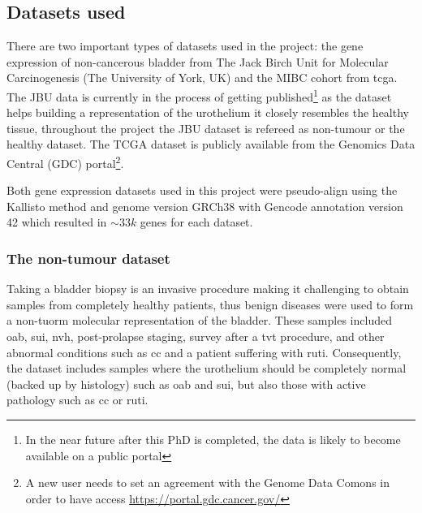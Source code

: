 \subsection{Datasets used} \label{s:lit:datasets_used}

There are two important types of datasets used in the project: the gene expression of non-cancerous bladder from The Jack Birch Unit for Molecular Carcinogenesis (The University of York, UK) and the MIBC cohort from \acrlong{tcga}. The JBU data is currently in the process of getting published\footnote{In the near future after this PhD is completed, the data is likely to become available on a public portal} as the dataset helps building a representation of the urothelium it closely resembles the healthy tissue, throughout the project the JBU dataset is refereed as non-tumour or the healthy dataset. The TCGA dataset is publicly available from the Genomics Data Central (GDC) portal\footnote{A new user needs to set an agreement with the Genome Data Comons in order to have access \url{https://portal.gdc.cancer.gov/}}.

Both gene expression datasets used in this project were pseudo-align using the Kallisto method\citep{Bray2016-cv} and genome version GRCh38 with Gencode annotation version 42 which resulted in $\sim33k$ genes for each dataset.

\subsubsection*{The non-tumour dataset} \label{s:lit:non_tum_data}

Taking a bladder biopsy is an invasive procedure making it challenging to obtain samples from completely healthy patients, thus benign diseases were used to form a non-tuorm molecular representation of the bladder. These samples included \acrfull{oab}, \acrfull{sui}, \acrfull{nvh}, post-prolapse staging, survey after a \acrfull{tvt} procedure, and other abnormal conditions such as \acrfull{cc} and a patient suffering with \acrfull{ruti}. Consequently, the dataset includes samples where the urothelium should be completely normal (backed up by histology) such as \acrshort{oab} and \acrshort{sui}, but also those with active pathology such as \acrshort{cc} or \acrshort{ruti}.

